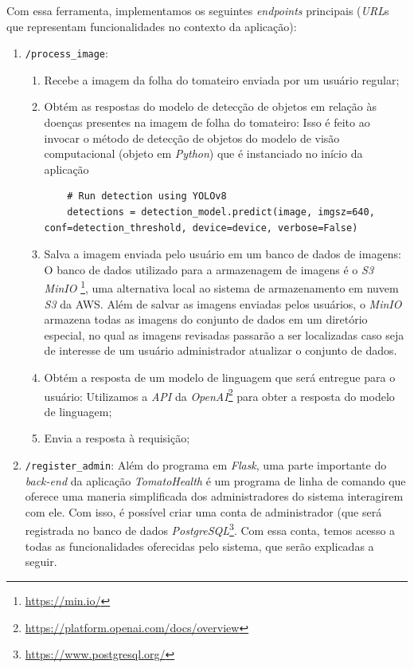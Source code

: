 Com essa ferramenta, implementamos os seguintes \emph{endpoints} principais (\emph{URL}s que representam funcionalidades no contexto da aplicação):
\begin{enumerate}
    \item \texttt{/process\_image}:
    \begin{enumerate}
        \item Recebe a imagem da folha do tomateiro enviada por um usuário regular;
        \item Obtém as respostas do modelo de detecção de objetos em relação às doenças presentes na imagem de folha do tomateiro:
        Isso é feito ao invocar o método de detecção de objetos do modelo de visão computacional (objeto em \emph{Python}) que é instanciado no início da aplicação
        \begin{lstlisting}
    # Run detection using YOLOv8
    detections = detection_model.predict(image, imgsz=640, conf=detection_threshold, device=device, verbose=False)
        \end{lstlisting}
        \item Salva a imagem enviada pelo usuário em um banco de dados de imagens:
        O banco de dados utilizado para a armazenagem de imagens é o \emph{S3 MinIO} \footnote{\url{https://min.io/}}, uma alternativa local ao sistema de armazenamento em nuvem \emph{S3} da AWS. Além de salvar as imagens enviadas pelos usuários, o \emph{MinIO} armazena todas as imagens do conjunto de dados em um diretório especial, no qual as imagens revisadas passarão a ser localizadas caso seja de interesse de um usuário administrador atualizar o conjunto de dados.
        \item Obtém a resposta de um modelo de linguagem que será entregue para o usuário:
        Utilizamos a \emph{API} da \emph{OpenAI}\footnote{\url{https://platform.openai.com/docs/overview}} para obter a resposta do modelo de linguagem;
        \item Envia a resposta à requisição;
    \end{enumerate}
    \item \texttt{/register\_admin}:
    Além do programa em \emph{Flask}, uma parte importante do \emph{back-end} da aplicação \emph{TomatoHealth} é um programa de linha de comando que oferece uma maneria simplificada dos administradores do sistema interagirem com ele. Com isso, é possível criar uma conta de administrador (que será registrada no banco de dados \emph{PostgreSQL}\footnote{\url{https://www.postgresql.org/}}. Com essa conta, temos acesso a todas as funcionalidades oferecidas pelo sistema, que serão explicadas a seguir.

\end{enumerate}

